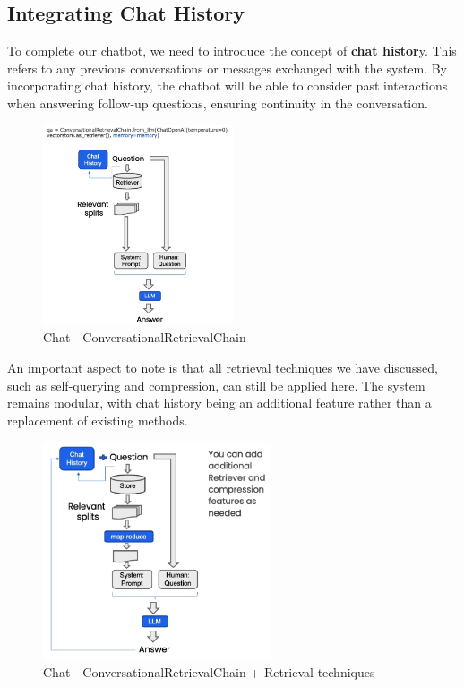 \documentclass{article}
\begin{document}
\subsection{Integrating Chat History}

To complete our chatbot, we need to introduce the concept of \textbf{chat histor}y. This refers to any previous conversations or messages exchanged with the system. By incorporating chat history, the chatbot will be able to consider past interactions when answering follow-up questions, ensuring continuity in the conversation.

\begin{figure}[H]
    \centering
    \includegraphics[width=0.5\textwidth]{images/langchain_chat_with_your_data_020.png}
    \caption{Chat - ConversationalRetrievalChain}
    \label{fig:chat_conversationalretrievalchain}
\end{figure}

An important aspect to note is that all retrieval techniques we have discussed, such as self-querying and compression, can still be applied here. The system remains modular, with chat history being an additional feature rather than a replacement of existing methods.

\begin{figure}[H]
    \centering
    \includegraphics[width=0.6\textwidth]{images/langchain_chat_with_your_data_021.png}
    \caption{Chat - ConversationalRetrievalChain + Retrieval techniques}
    \label{fig:chat_conversationalretrievalchain_retrieval_techniques}
\end{figure}
\end{document}
